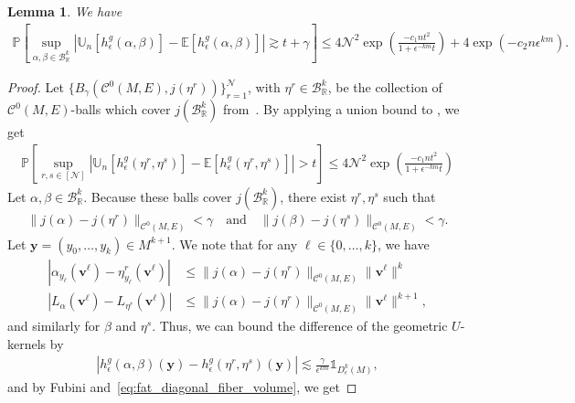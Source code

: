 \documentclass[11pt,reqno]{amsproc}
\numberwithin{equation}{section}
\newcommand{\R}{\mathbb{R}}
\newcommand{\E}{\mathbb{E}}
\newcommand{\U}{\mathbb{U}}
\newcommand{\PP}{\mathbb{P}}
\newcommand{\one}{\mathbb{1}}
\newcommand{\by}{\mathbf{y}}
\newcommand{\bv}{\mathbf{v}}
\newcommand{\cN}{\mathcal{N}}
\newcommand{\cB}{\mathcal{B}}
\newcommand{\cC}{\mathcal{C}}
\newcommand{\ls}{\lesssim}
\newcommand{\ball}[3]{B_{#3}(#1, #2)} %
\newtheorem{lemma}[counter]{Lemma}
\newcommand{\andd}{\quad \text{and} \quad}
\theoremstyle{definition}
\theoremstyle{plain}
\begin{document}
    \begin{lemma} \label{lem:uc_geometric_variance}
        We have 
        \begin{align}
            \PP \left[ \sup_{\alpha, \beta \in \cB_\R^k} \left| \U_n[h^g_\epsilon(\alpha, \beta)] - \E[h^g_\epsilon(\alpha, \beta)]\right| \gtrsim t + \gamma  \right] \leq 4\cN^2 \exp\left(\frac{-c_1 n t^2}{1 +  \epsilon^{-km}t}\right) + 4\exp( - c_2n \epsilon^{km}).
        \end{align}
    \end{lemma}
    \begin{proof}
        Let $\{\ball{\cC^0(M,E)}{j(\eta^r)}{\gamma}\}_{r=1}^{\cN}$, with $\eta^r\in\cB_\R^k$, be the collection of $\cC^0(M,E)$-balls which cover $j(\cB_\R^k)$ from~. By applying a union bound to , we get
        \begin{align} \label{eq:uc_union_variance}
            \PP\left[ \sup_{r,s \in [\cN]} \left| \U_n[h^g_\epsilon(\eta^r, \eta^s)] - \E[h^g_\epsilon(\eta^r, \eta^s)]\right| > t\right] \leq 4\cN^2 \exp\left(\frac{-c_1n t^2}{ 1+  \epsilon^{-km}t}\right)
        \end{align}
        Let $\alpha, \beta \in \cB_\R^k$. Because these balls cover $j(\cB_\R^k)$, there exist $\eta^r, \eta^s$ such that
        \begin{align}
            \|j(\alpha) - j(\eta^r)\|_{\cC^0(M,E)}< \gamma \andd \|j(\beta) - j(\eta^s)\|_{\cC^0(M,E)} < \gamma. 
        \end{align}
        Let $\by = (y_0, \ldots, y_k) \in M^{k+1}$. We note that for any $\ell \in \{0,\ldots,k\}$, we have
        \begin{align}
            |\alpha_{y_\ell}(\bv^\ell) - \eta^r_{y_\ell}(\bv^\ell)| &\leq \|j(\alpha) - j(\eta^r)\|_{\cC^0(M,E)} \|\bv^\ell\|^k\\
            |L_\alpha(\bv^\ell) - L_{\eta^r}(\bv^\ell)| &\leq\|j(\alpha) - j(\eta^r)\|_{\cC^0(M,E)}\|\bv^\ell\|^{k+1},
        \end{align}
        and similarly for $\beta$ and $\eta^s$. 
        Thus, we can bound the difference of the geometric $U$-kernels by
        \begin{align} \label{eq:geometric_kernel_error}
            |h^g_{\epsilon}(\alpha, \beta)(\by) - h^g_{\epsilon}(\eta^r, \eta^s)(\by)|  \ls \frac{\gamma}{\epsilon^{km}} \one_{D^k_\epsilon(M)},
        \end{align}
        and by Fubini and~\eqref{eq:fat_diagonal_fiber_volume}, we get

\end{proof}
\end{document}
